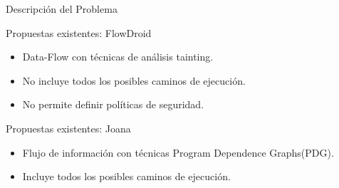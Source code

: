 \begin{frame}{Descripción del Problema}
\begin{block}{Propuestas existentes: FlowDroid}
\begin{itemize}
	  \item Data-Flow con técnicas de análisis tainting.
	  \item No incluye todos los posibles caminos de ejecución.
	  \item No permite definir políticas de seguridad.
\end{itemize}
\end{block}
\pause
\begin{block}{Propuestas existentes: Joana}
\begin{itemize}
  	  \item Flujo de información con técnicas Program Dependence Graphs(PDG). 
	  \item Incluye todos los posibles caminos de ejecución.
\end{itemize}
\end{block}
\end{frame}

